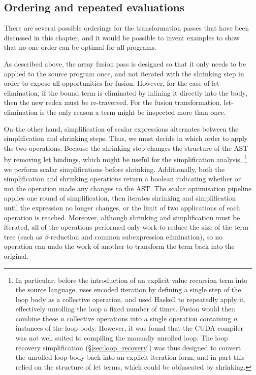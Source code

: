 \subsection{Ordering and repeated evaluations}

There are several possible orderings for the transformation passes that have
been discussed in this chapter, and it would be possible to invent examples to
show that no one order can be optimal for all programs.

As described above, the array fusion pass is designed so that it only needs to
be applied to the source program once, and not iterated with the shrinking step
in order to expose all opportunities for fusion. However, for the case of
let-elimination, if the bound term is eliminated by inlining it directly into
the body, then the new redex must be re-traversed. For the fusion
transformation, let-elimination is the only reason a term might be inspected
more than once.

On the other hand, simplification of scalar expressions alternates between the
simplification and shrinking steps. Thus, we must decide in which order to apply
the two operations. Because the shrinking step changes the structure of the AST
by removing let bindings, which might be useful for the simplification
analysis,%
\footnote{In particular, before the introduction of an explicit value recursion
term into the source language, uses encoded iteration by defining a single step
of the loop body as a collective operation, and used Haskell to repeatedly
apply it, effectively unrolling the loop a fixed number of times. Fusion would
then combine these $n$ collective operations into a single operation containing
$n$ instances of the loop body. However, it was found that the CUDA compiler was
not well suited to compiling the manually unrolled loop. The loop recovery
simplification (\S\ref{sec:loop_recovery}) was thus designed to convert the
unrolled loop body back into an explicit iteration form, and in part this relied
on the structure of let terms, which could be obfuscated by shrinking.}
%
we perform scalar simplifications before shrinking. Additionally, both the
simplification and shrinking operations return a boolean indicating whether or
not the operation made any changes to the AST. The scalar optimisation pipeline
applies one round of simplification, then iterates shrinking and simplification
until the expression no longer changes, or the limit of two applications of each
operation is reached. Moreover, although shrinking and simplification must be
iterated, all of the operations performed only work to reduce the size of the
term tree (such as $\beta$-reduction and common subexpression elimination), so
no operation can undo the work of another to transform the term back into the
original.


